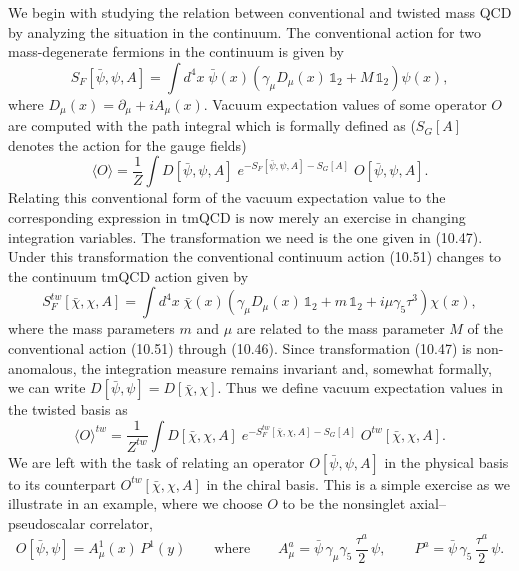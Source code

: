 We begin with studying the relation between conventional and twisted mass QCD
by analyzing the situation in the continuum. The conventional action for two
mass-degenerate fermions in the continuum is given by
\begin{equation}
  S_F[\bar\psi, \psi, A] = \int d^4x\;
  \bar\psi(x)\left(\gamma_\mu D_\mu(x)\,\mathbb{1}_2
  + M\,\mathbb{1}_2\right)\psi(x) ,
\end{equation}
where $D_\mu(x) = \partial_\mu + iA_\mu(x)$. Vacuum expectation values of
some operator $O$ are computed with the path integral which is formally
defined as ($S_G[A]$ denotes the action for the gauge fields)
\begin{equation}
  \langle O\rangle = \frac{1}{Z}
  \int D[\bar\psi, \psi, A]\;
  e^{-S_F[\bar\psi,\psi,A] - S_G[A]}\; O[\bar\psi, \psi, A] .
\end{equation}
Relating this conventional form of the vacuum expectation value to the
corresponding expression in tmQCD is now merely an exercise in changing
integration variables. The transformation we need is the one given in (10.47).
Under this transformation the conventional continuum action (10.51) changes
to the continuum tmQCD action given by
\begin{equation}
  S_F^{tw}[\bar\chi, \chi, A] = \int d^4x\;
  \bar\chi(x)\left(\gamma_\mu D_\mu(x)\,\mathbb{1}_2
  + m\,\mathbb{1}_2 + i\mu\gamma_5\tau^3\right)\chi(x) ,
\end{equation}
where the mass parameters $m$ and $\mu$ are related to the mass parameter $M$
of the conventional action (10.51) through (10.46). Since transformation
(10.47) is non-anomalous, the integration measure remains invariant and,
somewhat formally, we can write $D[\bar\psi, \psi] = D[\bar\chi, \chi]$. Thus
we define vacuum expectation values in the twisted basis as
\begin{equation}
  \langle O\rangle^{tw} = \frac{1}{Z^{tw}}
  \int D[\bar\chi, \chi, A]\;
  e^{-S_F^{tw}[\bar\chi,\chi,A] - S_G[A]}\;
  O^{tw}[\bar\chi, \chi, A] .
\end{equation}
We are left with the task of relating an operator $O[\bar\psi, \psi, A]$ in
the physical basis to its counterpart $O^{tw}[\bar\chi, \chi, A]$ in the
chiral basis. This is a simple exercise as we illustrate in an example, where
we choose $O$ to be the nonsinglet axial--pseudoscalar correlator,
\begin{equation}
  O[\bar\psi, \psi] = A^1_\mu(x)\,P^1(y)
  \qquad \text{where} \qquad
  A^a_\mu = \bar\psi\,\gamma_\mu\gamma_5\,\frac{\tau^a}{2}\,\psi , \qquad
  P^a = \bar\psi\,\gamma_5\,\frac{\tau^a}{2}\,\psi .
\end{equation}
